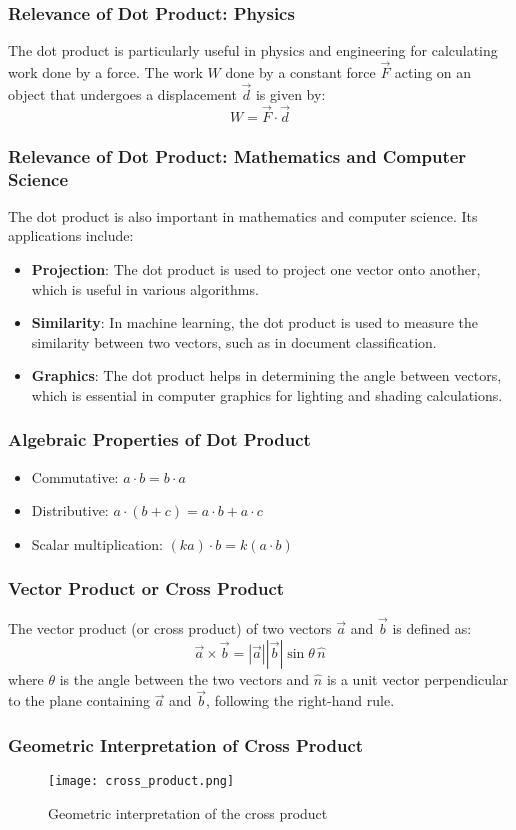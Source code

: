 \begin{frame}
\frametitle{Relevance of Dot Product: Physics}
The dot product is particularly useful in physics and engineering for calculating work done by a force. The work \(W\) done by a constant force \(\vec{F}\) acting on an object that undergoes a displacement \(\vec{d}\) is given by:
\[
W = \vec{F} \cdot \vec{d}
\]
\end{frame}
\begin{frame}
\frametitle{Relevance of Dot Product: Mathematics and Computer Science}
The dot product is also important in mathematics and computer science. Its applications include:
\begin{itemize}
    \item \textbf{Projection}: The dot product is used to project one vector onto another, which is useful in various algorithms.
    \item \textbf{Similarity}: In machine learning, the dot product is used to measure the similarity between two vectors, such as in document classification.
    \item \textbf{Graphics}: The dot product helps in determining the angle between vectors, which is essential in computer graphics for lighting and shading calculations.
\end{itemize}
\end{frame}
\begin{frame}
    \frametitle{Algebraic Properties of Dot Product}
    \begin{itemize}
        \item Commutative: \(a \cdot b = b \cdot a\)
        \item Distributive: \(a \cdot (b + c) = a \cdot b + a \cdot c\)
        \item Scalar multiplication: \((k a) \cdot b = k (a \cdot b)\)
    \end{itemize}
\end{frame}

\begin{frame}
    \frametitle{Vector Product or Cross Product}
    The vector product (or cross product) of two vectors \(\vec{a}\) and \(\vec{b}\) is defined as:
    \[
    \vec{a} \times \vec{b} = |\vec{a}| |\vec{b}| \sin \theta \, \hat{n}
    \]
    where \(\theta\) is the angle between the two vectors and \(\hat{n}\) is a unit vector perpendicular to the plane containing \(\vec{a}\) and \(\vec{b}\), following the right-hand rule.
\end{frame}

\begin{frame}
\frametitle{Geometric Interpretation of Cross Product}
\begin{figure}
    \centering
    \texttt{[image: cross\_product.png]}
    \caption{Geometric interpretation of the cross product}
\end{figure}
\end{frame} 

